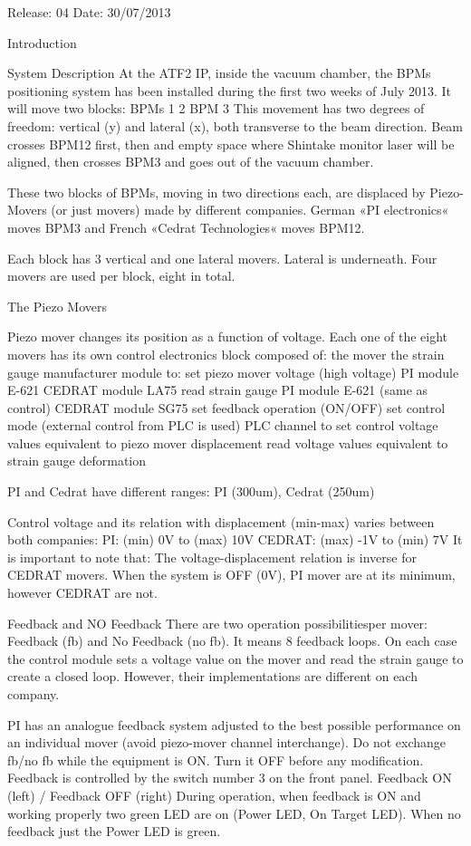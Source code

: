 \documentclass[a4paper,11pt]{book}
\begin{document}
Release: 04
Date: 30/07/2013


Introduction

System Description
At the ATF2 IP, inside the vacuum chamber, the BPMs positioning system has been installed during the first two weeks of July 2013.
It will move two blocks: 
BPMs 1 2
BPM 3
This movement has two degrees of freedom: vertical (y) and lateral (x), both transverse to the beam direction. Beam crosses BPM12 first, then and empty space where Shintake monitor laser will be aligned, then crosses BPM3 and goes out of the vacuum chamber.

These two blocks of BPMs, moving in two directions each, are displaced by Piezo-Movers (or just movers) made by different companies. German «PI electronics« moves  BPM3 and French «Cedrat Technologies« moves BPM12.

Each block has 3 vertical and one lateral movers. Lateral is underneath. Four movers are used per block, eight in total.

The Piezo Movers

Piezo mover changes its position as a function of voltage. Each one of the eight movers has its own control electronics block composed of: 
the mover
the strain gauge
manufacturer module to:
set piezo mover voltage (high voltage)
PI module E-621
CEDRAT module LA75
read strain gauge
PI module E-621 (same as control)
CEDRAT module SG75
set feedback operation (ON/OFF)
set control mode (external control from PLC is used)
PLC channel to
set control voltage values equivalent to piezo mover displacement
read voltage values equivalent to strain gauge deformation

PI and Cedrat have different ranges:
PI (300um), Cedrat (250um)

Control voltage and its relation with displacement (min-max) varies between both companies:
PI: 		(min)   0V   	to 	(max) 10V
CEDRAT: 	(max) -1V 	to	(min)    7V
It is important to note that:
The voltage-displacement relation is inverse for CEDRAT movers.
When the system is OFF (0V), PI mover are at its minimum, however CEDRAT are not.

Feedback and NO Feedback 
There are two operation possibilitiesper mover: Feedback (fb) and No Feedback (no fb). It means 8 feedback loops. On each case the control module sets a voltage value on the mover and read the strain gauge to create a closed loop. However, their implementations are different on each company.

PI has an analogue feedback system adjusted to the best possible performance on an individual mover (avoid piezo-mover channel interchange). Do not exchange fb/no fb while the equipment is ON. Turn it OFF before any modification. 
Feedback is controlled by the switch number 3  on the front panel. 
Feedback ON (left) / Feedback OFF (right)
During operation, when feedback is ON and working properly two green LED are on (Power LED, On Target LED). When no feedback just the Power LED is green.
\end{document}
